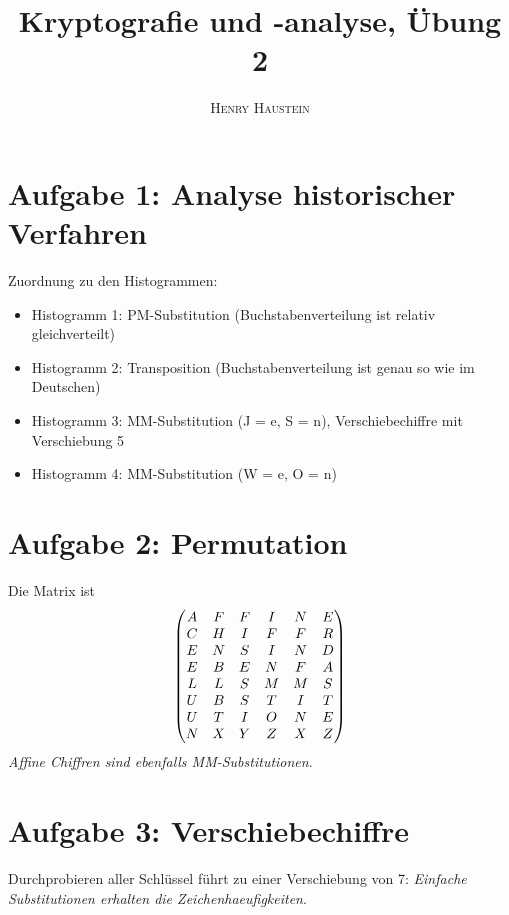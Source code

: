 \documentclass{article}
\title{\textbf{Kryptografie und -analyse, Übung 2}}
\author{\textsc{Henry Haustein}}
\date{}
\begin{document}
	\maketitle
	
	\section*{Aufgabe 1: Analyse historischer Verfahren}
	Zuordnung zu den Histogrammen:
	\begin{itemize}
		\item Histogramm 1: PM-Substitution (Buchstabenverteilung ist relativ gleichverteilt)
		\item Histogramm 2: Transposition (Buchstabenverteilung ist genau so wie im Deutschen)
		\item Histogramm 3: MM-Substitution (J = e, S = n), Verschiebechiffre mit Verschiebung 5
		\item Histogramm 4: MM-Substitution (W = e, O = n)
	\end{itemize}

	\section*{Aufgabe 2: Permutation}
	Die Matrix ist
	\begin{align}
		\begin{pmatrix}
			A & F & F & I & N & E \\
			C & H & I & F & F & R \\
			E & N & S & I & N & D \\
			E & B & E & N & F & A \\
			L & L & S & M & M & S \\
			U & B & S & T & I & T \\
			U & T & I & O & N & E \\
			N & X & Y & Z & X & Z
		\end{pmatrix} \notag
	\end{align}
	\textit{Affine Chiffren sind ebenfalls MM-Substitutionen}.
	
	\section*{Aufgabe 3: Verschiebechiffre}
	Durchprobieren aller Schlüssel führt zu einer Verschiebung von 7: \textit{Einfache Substitutionen erhalten die Zeichenhaeufigkeiten}.
	
\end{document}

